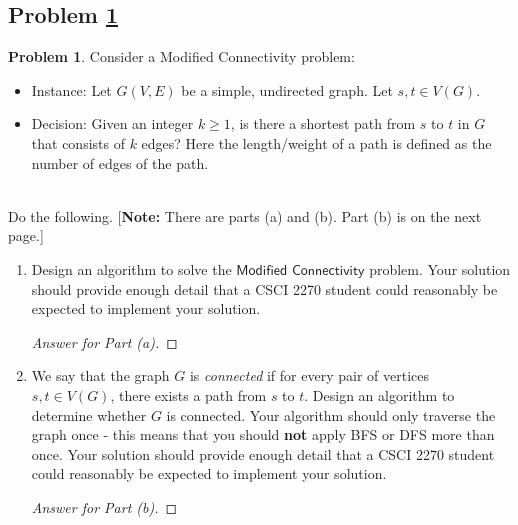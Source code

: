 \documentclass[11pt]{article}
\theoremstyle{definition}
\theoremstyle{definition}
\newtheorem{required}{Problem}
\theoremstyle{definition}
\begin{document}
\subsection{Problem \ref{DFS1}}
\begin{required} \label{DFS1}
Consider a \textsf{Modified Connectivity} problem:
\begin{itemize}
\item \textsf{Instance:} Let $G(V, E)$ be a simple, undirected graph. Let $s, t \in V(G)$.
\item \textsf{Decision:} Given an integer $k\geq 1$,  is there a shortest path from $s$ to $t$ in $G$ that consists of $k$ edges? Here the length/weight of a path is defined as the number of edges of the path. 
\end{itemize}

\noindent \\ Do the following. [\textbf{Note:} There are parts (a) and (b). Part (b) is on the next page.]
\begin{enumerate}[label=(\alph*)]
\item Design an algorithm to solve the $\textsf{Modified Connectivity}$ problem. Your solution should provide enough detail that a CSCI 2270 student could reasonably be expected to implement your solution.
\begin{proof}[Answer for Part (a)]
\end{proof}



\newpage
\item We say that the graph $G$ is \textit{connected} if for every pair of vertices $s, t \in V(G)$, there exists a path from $s$ to $t$. Design an algorithm to determine whether $G$ is connected. Your algorithm should only traverse the graph once - this means that you should \textbf{not} apply BFS or DFS more than once. Your solution should provide enough detail that a CSCI 2270 student could reasonably be expected to implement your solution.

\begin{proof}[Answer for Part (b)]
\end{proof}
\end{enumerate}
\end{required}






\newpage
\end{document}
